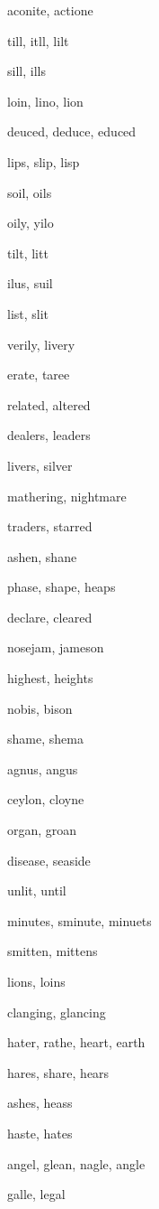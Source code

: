     \item aconite, actione
    \item till, itll, lilt
    \item sill, ills
    \item loin, lino, lion
    \item deuced, deduce, educed
    \item lips, slip, lisp
    \item soil, oils
    \item oily, yilo
    \item tilt, litt
    \item ilus, suil
    \item list, slit
    \item verily, livery
    \item erate, taree
    \item related, altered
    \item dealers, leaders
    \item livers, silver
    \item mathering, nightmare
    \item traders, starred
    \item ashen, shane
    \item phase, shape, heaps
    \item declare, cleared
    \item nosejam, jameson
    \item highest, heights
    \item nobis, bison
    \item shame, shema
    \item agnus, angus
    \item ceylon, cloyne
    \item organ, groan
    \item disease, seaside
    \item unlit, until
    \item minutes, sminute, minuets
    \item smitten, mittens
    \item lions, loins
    \item clanging, glancing
    \item hater, rathe, heart, earth
    \item hares, share, hears
    \item ashes, heass
    \item haste, hates
    \item angel, glean, nagle, angle
    \item galle, legal
